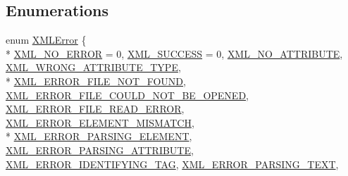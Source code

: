 \subsection*{Enumerations}
\begin{DoxyCompactItemize}
\item 
enum \hyperlink{namespacetinyxml2_a1fbf88509c3ac88c09117b1947414e08}{X\-M\-L\-Error} \{ \\*
\hyperlink{namespacetinyxml2_a1fbf88509c3ac88c09117b1947414e08ad3b3f200ced09c9fc4166134a4ff8fef}{X\-M\-L\-\_\-\-N\-O\-\_\-\-E\-R\-R\-O\-R} = 0, 
\hyperlink{namespacetinyxml2_a1fbf88509c3ac88c09117b1947414e08a1fe1262fdb5ac05dd9cc4631f8c8e00d}{X\-M\-L\-\_\-\-S\-U\-C\-C\-E\-S\-S} = 0, 
\hyperlink{namespacetinyxml2_a1fbf88509c3ac88c09117b1947414e08abefb89c44285fb68e2218b2c71767f27}{X\-M\-L\-\_\-\-N\-O\-\_\-\-A\-T\-T\-R\-I\-B\-U\-T\-E}, 
\hyperlink{namespacetinyxml2_a1fbf88509c3ac88c09117b1947414e08ae9d8ee545a3a69e90df303257a658113}{X\-M\-L\-\_\-\-W\-R\-O\-N\-G\-\_\-\-A\-T\-T\-R\-I\-B\-U\-T\-E\-\_\-\-T\-Y\-P\-E}, 
\\*
\hyperlink{namespacetinyxml2_a1fbf88509c3ac88c09117b1947414e08a38fd2a97fb1dbebd4c3640d75dc01a94}{X\-M\-L\-\_\-\-E\-R\-R\-O\-R\-\_\-\-F\-I\-L\-E\-\_\-\-N\-O\-T\-\_\-\-F\-O\-U\-N\-D}, 
\hyperlink{namespacetinyxml2_a1fbf88509c3ac88c09117b1947414e08afbbf37655523b79a88b04b77ec0f1258}{X\-M\-L\-\_\-\-E\-R\-R\-O\-R\-\_\-\-F\-I\-L\-E\-\_\-\-C\-O\-U\-L\-D\-\_\-\-N\-O\-T\-\_\-\-B\-E\-\_\-\-O\-P\-E\-N\-E\-D}, 
\hyperlink{namespacetinyxml2_a1fbf88509c3ac88c09117b1947414e08a8d4dd3ce2dee784a53f62fa8a6ac83ee}{X\-M\-L\-\_\-\-E\-R\-R\-O\-R\-\_\-\-F\-I\-L\-E\-\_\-\-R\-E\-A\-D\-\_\-\-E\-R\-R\-O\-R}, 
\hyperlink{namespacetinyxml2_a1fbf88509c3ac88c09117b1947414e08a37759723c0c5e954597654e4eccb4f4d}{X\-M\-L\-\_\-\-E\-R\-R\-O\-R\-\_\-\-E\-L\-E\-M\-E\-N\-T\-\_\-\-M\-I\-S\-M\-A\-T\-C\-H}, 
\\*
\hyperlink{namespacetinyxml2_a1fbf88509c3ac88c09117b1947414e08afa96ea783aa93ea212f9e2d7d3a70ba5}{X\-M\-L\-\_\-\-E\-R\-R\-O\-R\-\_\-\-P\-A\-R\-S\-I\-N\-G\-\_\-\-E\-L\-E\-M\-E\-N\-T}, 
\hyperlink{namespacetinyxml2_a1fbf88509c3ac88c09117b1947414e08a380fd8846799b88773321efae83d26a3}{X\-M\-L\-\_\-\-E\-R\-R\-O\-R\-\_\-\-P\-A\-R\-S\-I\-N\-G\-\_\-\-A\-T\-T\-R\-I\-B\-U\-T\-E}, 
\hyperlink{namespacetinyxml2_a1fbf88509c3ac88c09117b1947414e08a48e646cfca6de90c3770faf535d3ed6b}{X\-M\-L\-\_\-\-E\-R\-R\-O\-R\-\_\-\-I\-D\-E\-N\-T\-I\-F\-Y\-I\-N\-G\-\_\-\-T\-A\-G}, 
\hyperlink{namespacetinyxml2_a1fbf88509c3ac88c09117b1947414e08a50ead30b94c7ae2957b9ccb08ec0994d}{X\-M\-L\-\_\-\-E\-R\-R\-O\-R\-\_\-\-P\-A\-R\-S\-I\-N\-G\-\_\-\-T\-E\-X\-T}, 

\end{DoxyCompactItemize}

